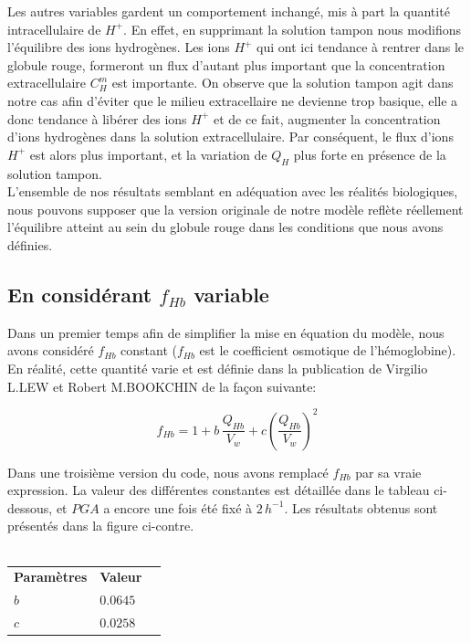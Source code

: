 \documentclass[a4paper,fleqn]{article}
\begin{document}
Les autres variables gardent un comportement inchangé, mis à part la quantité intracellulaire de $H^+$. En effet, en supprimant la solution tampon nous modifions l'équilibre des ions hydrogènes. Les ions $H^+$ qui ont ici tendance à rentrer dans le globule rouge, formeront un flux d'autant plus important que la concentration extracellulaire $C_H^m$ est importante. On observe que la solution tampon agit dans notre cas afin d'éviter que le milieu extracellaire ne devienne trop basique, elle a donc tendance à libérer des ions $H^+$ et de ce fait, augmenter la concentration d'ions hydrogènes dans la solution extracellulaire. Par conséquent, le flux d'ions $H^+$ est alors plus important, et la variation de $Q_H$ plus forte en présence de la solution tampon.\\

L'ensemble de nos résultats semblant en adéquation avec les réalités biologiques, nous pouvons supposer que la version originale de notre modèle reflète réellement l'équilibre atteint au sein du globule rouge dans les conditions que nous avons définies.\\

\subsection{En considérant $f_{Hb}$ variable} 

Dans un premier temps afin de simplifier la mise en équation du modèle, nous avons considéré $f_{Hb}$ constant ($f_{Hb}$ est le coefficient osmotique de l'hémoglobine). En réalité, cette quantité varie et est définie dans la publication de Virgilio L.LEW et Robert M.BOOKCHIN de la façon suivante:

\begin{equation}
f_{Hb}=1+b\,\frac{Q_{Hb}}{V_w }+{c}\left(\frac{Q_{Hb}}{V_w }\right)^2
\end{equation}


Dans une troisième version du code, nous avons remplacé $f_{Hb}$ par sa vraie expression. La valeur des différentes constantes est détaillée dans le tableau ci-dessous, et $PGA$ a encore une fois été fixé à $2\,h^{-1}$. Les résultats obtenus sont présentés dans la figure ci-contre.\\ 
\\

\begin{tabular}{p{3cm}lr}
\textbf{Paramètres}                                                   & \textbf{Valeur} \\
$b$ & $0.0645$    \\
$c$ & $0.0258$   \\
\end{tabular}
\end{document}
